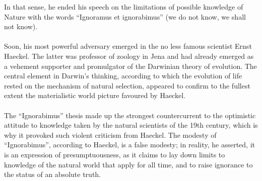 \documentclass[10pt]{article}
\newcounter{theo}
\begin{document}
            \indent In that sense, he ended his speech on the limitations of possible knowledge of Nature with the words “Ignoramus et ignorabimus” (we do not know, we shall not know).
            \\
            \\
            \indent Soon, his most powerful adversary emerged in the no less famous scientist Ernst Haeckel. The latter was professor of zoology in Jena and had already emerged as a vehement supporter and promulgator of the Darwinian theory of evolution. The central element in Darwin's thinking, according to which the evolution of life rested on the mechanism of natural selection, appeared to confirm to the fullest extent the materialistic world picture favoured by Haeckel.
            \\
            \\
            \indent The “Ignorabimus” thesis made up the strongest countercurrent to the optimistic attitude to knowledge taken by the natural scientists of the 19th century, which is why it provoked such violent criticism from Haeckel. The modesty of “Ignorabimus”, according to Haeckel, is a false modesty; in reality, he asserted, it is an expression of presumptuousness, as it claims to lay down limits to knowledge of the natural world that apply for all time, and to raise ignorance to the status of an absolute truth.
\end{document}

